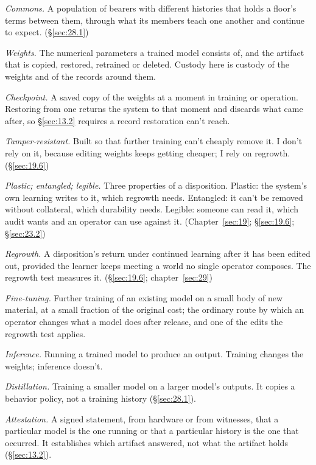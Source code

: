 \emph{Commons.} A population of bearers with different histories that holds a floor's terms between them, through what its members teach one another and continue to expect. (\S\ref{sec:28.1})

\emph{Weights.} The numerical parameters a trained model consists of, and the artifact that is copied, restored, retrained or deleted. Custody here is custody of the weights and of the records around them.

\emph{Checkpoint.} A saved copy of the weights at a moment in training or operation. Restoring from one returns the system to that moment and discards what came after, so \S\ref{sec:13.2} requires a record restoration can't reach.

\emph{Tamper-resistant.} Built so that further training can't cheaply remove it. I don't rely on it, because editing weights keeps getting cheaper; I rely on regrowth. (\S\ref{sec:19.6})

\emph{Plastic; entangled; legible.} Three properties of a disposition. Plastic: the system's own learning writes to it, which regrowth needs. Entangled: it can't be removed without collateral, which durability needs. Legible: someone can read it, which audit wants and an operator can use against it. (Chapter~\ref{sec:19}; \S\ref{sec:19.6}; \S\ref{sec:23.2})

\emph{Regrowth.} A disposition's return under continued learning after it has been edited out, provided the learner keeps meeting a world no single operator composes. The regrowth test measures it. (\S\ref{sec:19.6}; chapter~\ref{sec:29})

\emph{Fine-tuning.} Further training of an existing model on a small body of new material, at a small fraction of the original cost; the ordinary route by which an operator changes what a model does after release, and one of the edits the regrowth test applies.

\emph{Inference.} Running a trained model to produce an output. Training changes the weights; inference doesn't.

\emph{Distillation.} Training a smaller model on a larger model's outputs. It copies a behavior policy, not a training history (\S\ref{sec:28.1}).

\emph{Attestation.} A signed statement, from hardware or from witnesses, that a particular model is the one running or that a particular history is the one that occurred. It establishes which artifact answered, not what the artifact holds (\S\ref{sec:13.2}).
